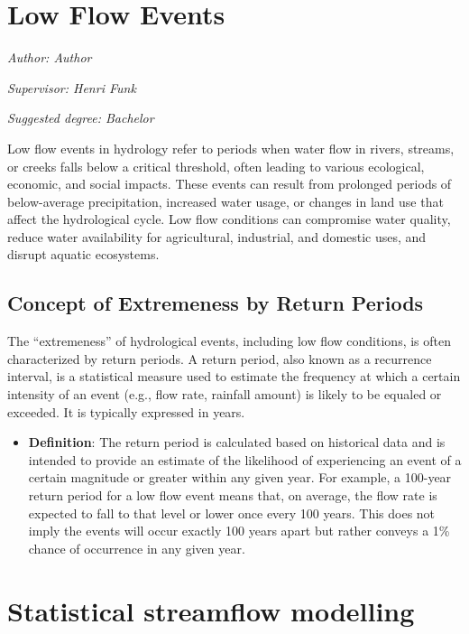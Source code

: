 \documentclass[
]{krantz}
\providecommand{\tightlist}{%
  \setlength{\itemsep}{0pt}\setlength{\parskip}{0pt}}
\begin{document}
\chapter{Low Flow Events}\label{lfe}

\emph{Author: Author}

\emph{Supervisor: Henri Funk}

\emph{Suggested degree: Bachelor}

Low flow events in hydrology refer to periods when water flow in rivers, streams, or creeks falls below a critical threshold, often leading to various ecological, economic, and social impacts. These events can result from prolonged periods of below-average precipitation, increased water usage, or changes in land use that affect the hydrological cycle. Low flow conditions can compromise water quality, reduce water availability for agricultural, industrial, and domestic uses, and disrupt aquatic ecosystems.

\section{Concept of Extremeness by Return Periods}\label{concept-of-extremeness-by-return-periods}

The ``extremeness'' of hydrological events, including low flow conditions, is often characterized by return periods. A return period, also known as a recurrence interval, is a statistical measure used to estimate the frequency at which a certain intensity of an event (e.g., flow rate, rainfall amount) is likely to be equaled or exceeded. It is typically expressed in years.

\begin{itemize}
\tightlist
\item
  \textbf{Definition}: The return period is calculated based on historical data and is intended to provide an estimate of the likelihood of experiencing an event of a certain magnitude or greater within any given year. For example, a 100-year return period for a low flow event means that, on average, the flow rate is expected to fall to that level or lower once every 100 years. This does not imply the events will occur exactly 100 years apart but rather conveys a 1\% chance of occurrence in any given year.
  \citet{du}
\end{itemize}

\chapter{Statistical streamflow modelling}\label{sm}
\end{document}
